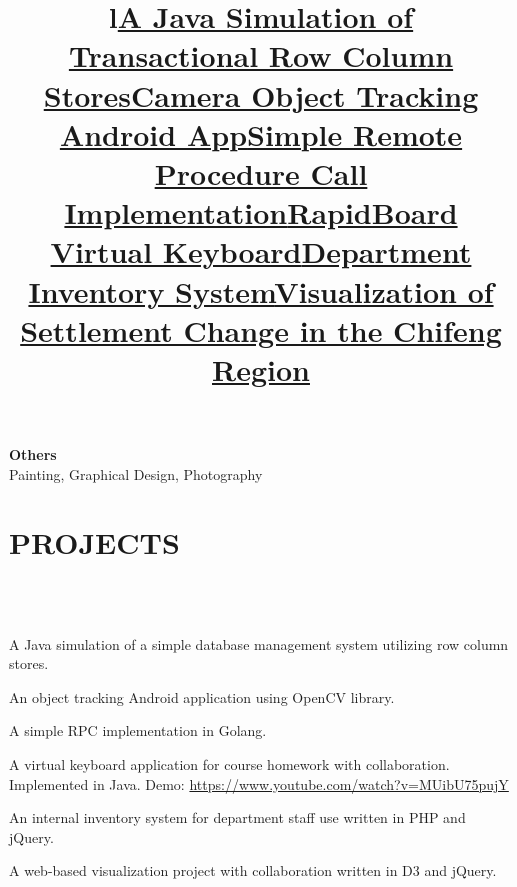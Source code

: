 \begin{resume}
\textbf{Others}\\
Painting, Graphical Design, Photography



\section{\textsc{PROJECTS}}
\begin{formatb}
  \title{l}\\
   \body\\
\end{formatb}

\title{\textbf{\href{https://github.com/adorazhang/AndroidOpenCVTracking}{A Java Simulation of Transactional Row Column Stores}}}
\begin{position}
	A Java simulation of a simple database management system utilizing row column stores.
\end{position}

\title{\textbf{\href{https://github.com/adorazhang/AndroidOpenCVTracking}{Camera Object Tracking Android App}}}
\begin{position}
An object tracking Android application using OpenCV library.
\end{position}

\title{\textbf{\href{https://github.com/adorazhang/SimpleRPC}{Simple Remote Procedure Call Implementation}}}
\begin{position}
A simple RPC implementation in Golang.
\end{position}

\title{\textbf{\href{https://www.youtube.com/watch?v=MUibU75pujY}{RapidBoard Virtual Keyboard}}}
\begin{position}
A virtual keyboard application for course homework with collaboration. Implemented in Java.
Demo: \url{https://www.youtube.com/watch?v=MUibU75pujY}
\end{position}

\title{\textbf{\href{http://intranet.cs.pitt.edu/inv.new/}{Department Inventory System}}}
\begin{position}
 An internal inventory system for department staff use written in PHP and jQuery.
\end{position}


\title{\textbf{\href{https://github.com/adorazhang/CodeSnippets/tree/master/visualization-project}{Visualization of Settlement Change in the Chifeng Region}}}
\begin{position}
A web-based visualization project with collaboration written in D3 and jQuery.
\end{position}



\end{resume}
